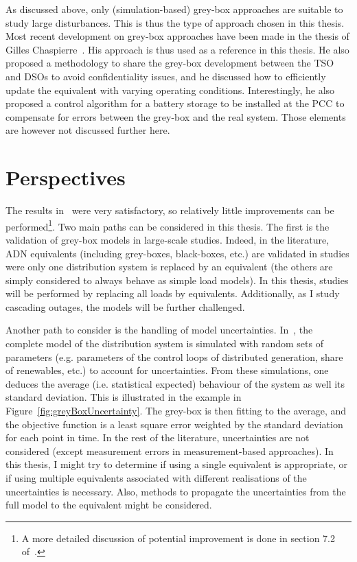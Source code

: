 As discussed above, only (simulation-based) grey-box approaches are suitable to study large disturbances. This is thus the type of approach chosen in this thesis. Most recent development on grey-box approaches have been made in the thesis of Gilles Chaspierre~\cite{ChaspierreThesis, ChaspierrePaper}. His approach is thus used as a reference in this thesis. He also proposed a methodology to share the grey-box development between the TSO and DSOs to avoid confidentiality issues, and he discussed how to efficiently update the equivalent with varying operating conditions. Interestingly, he also proposed a control algorithm for a battery storage to be installed at the PCC to compensate for errors between the grey-box and the real system. Those elements are however not discussed further here.


\section{Perspectives}
\label{sec:loadPerspectives}

The results in~\cite{ChaspierreThesis} were very satisfactory, so relatively little improvements can be performed\footnote{A more detailed discussion of potential improvement is done in section 7.2 of~\cite{ChaspierreThesis}.}. Two main paths can be considered in this thesis. The first is the validation of grey-box models in large-scale studies. Indeed, in the literature, ADN equivalents (including grey-boxes, black-boxes, etc.) are validated in studies were only one distribution system is replaced by an equivalent (the others are simply considered to always behave as simple load models). In this thesis, studies will be performed by replacing all loads by equivalents. Additionally, as I study cascading outages, the models will be further challenged.

Another path to consider is the handling of model uncertainties. In~\cite{ChaspierreThesis}, the complete model of the distribution system is simulated with random sets of parameters (e.g. parameters of the control loops of distributed generation, share of renewables, etc.) to account for uncertainties. From these simulations, one deduces the average (i.e. statistical expected) behaviour of the system as well its standard deviation. This is illustrated in the example in Figure~\ref{fig:greyBoxUncertainty}. The grey-box is then fitting to the average, and the objective function is a least square error weighted by the standard deviation for each point in time. In the rest of the literature, uncertainties are not considered (except measurement errors in measurement-based approaches). In this thesis, I might try to determine if using a single equivalent is appropriate, or if using multiple equivalents associated with different realisations of the uncertainties is necessary. Also, methods to propagate the uncertainties from the full model to the equivalent might be considered. %

